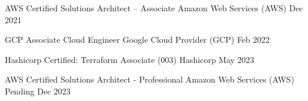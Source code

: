 

\begin{cvhonors}

  \cvhonor
    {AWS Certified Solutions Architect – Associate} %
    {Amazon Web Services (AWS)} %
    {} %
    {Dec 2021} %

  \cvhonor
    {GCP Associate Cloud Engineer} %
    {Google Cloud Provider (GCP)} %
    {} %
    {Feb 2022} %

  \cvhonor
    {Hashicorp Certified: Terraform Associate (003)} %
    {Hashicorp} %
    {} %
    {May 2023} %

  \cvhonor
    {AWS Certified Solutions Architect - Professional} %
    {Amazon Web Services (AWS)} %
    {Pending} %
    {Dec 2023} %

\end{cvhonors}
